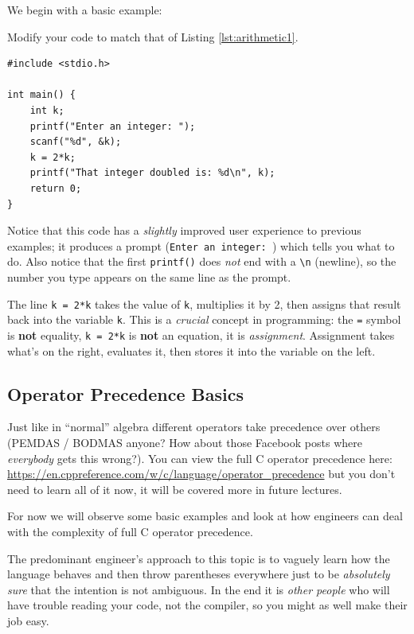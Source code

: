 \documentclass{lab}
\begin{document}
We begin with a basic example:

Modify your code to match that of Listing \ref{lst:arithmetic1}.

\begin{lstlisting}[style=CStyle,caption=A basic arithmetic example,label=lst:arithmetic1]
#include <stdio.h>

int main() {
	int k;
	printf("Enter an integer: ");
	scanf("%d", &k);
	k = 2*k;
	printf("That integer doubled is: %d\n", k);
	return 0;
}
\end{lstlisting}

Notice that this code has a \textit{slightly} improved user experience to previous examples; it produces a prompt (\texttt{Enter an integer: }) which tells you what to do. Also notice that the first \texttt{printf()} does \textit{not} end with a \texttt{\textbackslash n} (newline), so the number you type appears on the same line as the prompt.

The line \texttt{k = 2*k} takes the value of \texttt{k}, multiplies it by 2, then assigns that result back into the variable \texttt{k}. This is a \textit{crucial} concept in programming: the \texttt{=} symbol is \textbf{not} equality, \texttt{k = 2*k} is \textbf{not} an equation, it is \textit{assignment}. Assignment takes what's on the right, evaluates it, then stores it into the variable on the left.

\subsection{Operator Precedence Basics}

Just like in ``normal'' algebra different operators take precedence over others (PEMDAS / BODMAS anyone? How about those Facebook posts where \textit{everybody} gets this wrong?). You can view the full C operator precedence here: \url{https://en.cppreference.com/w/c/language/operator_precedence} but you don't need to learn all of it now, it will be covered more in future lectures.

For now we will observe some basic examples and look at how engineers can deal with the complexity of full C operator precedence.

The predominant engineer's approach to this topic is to vaguely learn how the language behaves and then throw parentheses everywhere just to be \textit{absolutely sure} that the intention is not ambiguous. In the end it is \textit{other people} who will have trouble reading your code, not the compiler, so you might as well make their job easy.
\end{document}
